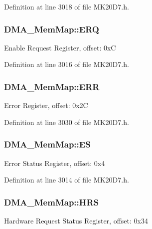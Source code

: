 Definition at line 3018 of file M\+K20\+D7.\+h.

\subsubsection[{\texorpdfstring{E\+RQ}{ERQ}}]{ D\+M\+A\+\_\+\+Mem\+Map\+::\+E\+RQ}\hypertarget{struct_d_m_a___mem_map_a5dd80d7a64d93b113f306641b42d4365}{}\label{struct_d_m_a___mem_map_a5dd80d7a64d93b113f306641b42d4365}
Enable Request Register, offset\+: 0xC 

Definition at line 3016 of file M\+K20\+D7.\+h.

\subsubsection[{\texorpdfstring{E\+RR}{ERR}}]{ D\+M\+A\+\_\+\+Mem\+Map\+::\+E\+RR}\hypertarget{struct_d_m_a___mem_map_a760f1e1822f3943fa11d044d350d260f}{}\label{struct_d_m_a___mem_map_a760f1e1822f3943fa11d044d350d260f}
Error Register, offset\+: 0x2C 

Definition at line 3030 of file M\+K20\+D7.\+h.

\subsubsection[{\texorpdfstring{ES}{ES}}]{ D\+M\+A\+\_\+\+Mem\+Map\+::\+ES}\hypertarget{struct_d_m_a___mem_map_a4c51938d27cc66f0d060c66ec7089ec7}{}\label{struct_d_m_a___mem_map_a4c51938d27cc66f0d060c66ec7089ec7}
Error Status Register, offset\+: 0x4 

Definition at line 3014 of file M\+K20\+D7.\+h.

\subsubsection[{\texorpdfstring{H\+RS}{HRS}}]{ D\+M\+A\+\_\+\+Mem\+Map\+::\+H\+RS}\hypertarget{struct_d_m_a___mem_map_af755455c2b137f7e78d5f53dc60e2049}{}\label{struct_d_m_a___mem_map_af755455c2b137f7e78d5f53dc60e2049}
Hardware Request Status Register, offset\+: 0x34 

